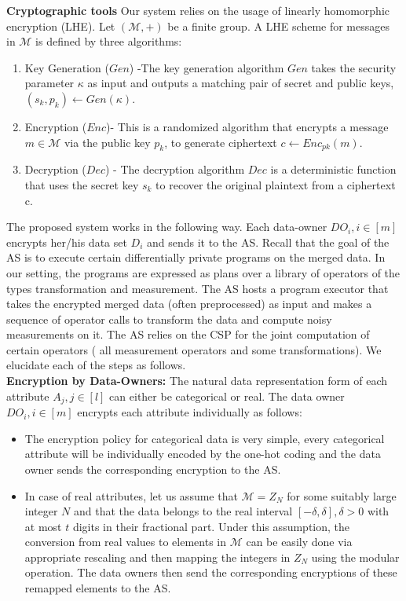 \textbf{Cryptographic tools} Our system relies on the usage of linearly homomorphic
encryption (LHE). Let $(\mathcal{M}, +)$ be a finite group. A LHE scheme 
for messages in $\mathcal{M}$ is defined by three algorithms:\begin{enumerate}
\item Key Generation ($Gen$) -The key generation algorithm $Gen$ takes the security parameter $\kappa$ as input and outputs
a matching pair of secret and public keys, $(s_k, p_k) \leftarrow Gen(\kappa)$.
\item Encryption ($Enc$)- This is a randomized algorithm that encrypts a message $m \in \mathcal{M}$ via the public key $p_k$, to generate ciphertext $c \leftarrow Enc_{pk}(m)$.
\item Decryption ($Dec$) - The decryption algorithm $Dec$ is a deterministic function that uses the secret key $s_k$ to
recover the original plaintext from a ciphertext c.
\end{enumerate}
The proposed system works in the following way. Each data-owner $DO_i, i \in [m]$ encrypts her/his data set $D_i$ and sends it to the AS. Recall that the goal of the AS is to execute certain differentially private programs on the merged data. In our setting, the programs are expressed as plans over a library of operators of the types transformation and measurement. The AS hosts a program executor that takes the encrypted merged data (often preprocessed) as input and makes a sequence of operator calls  to transform the data and compute noisy measurements on it. The AS relies on the CSP for the joint computation of certain operators ( all measurement operators and some transformations).  We elucidate each of the steps as follows.  \\
\textbf{Encryption by Data-Owners:} The natural data representation form of each attribute $A_j, j \in [l]$ can either be categorical or real. The data owner $DO_i, i \in [m]$ encrypts each attribute individually as follows:
\begin{itemize}\item The encryption policy for categorical data is very simple, every categorical attribute will be individually encoded by the one-hot coding and the data owner sends the corresponding encryption to the AS. \item  In case of real attributes, let us assume that $\mathcal{M}=Z_N$ for some suitably large integer $N$ and that the  data belongs to the real interval $[-\delta, \delta], \delta > 0$ with at most $t$ digits in their fractional part. Under this assumption, the conversion
from real values to elements in $\mathcal{M}$ can be easily done via appropriate rescaling 
and then mapping the integers in $Z_N$ using the modular operation. The data owners then send the corresponding encryptions of these remapped elements to the AS. \end{itemize} 
